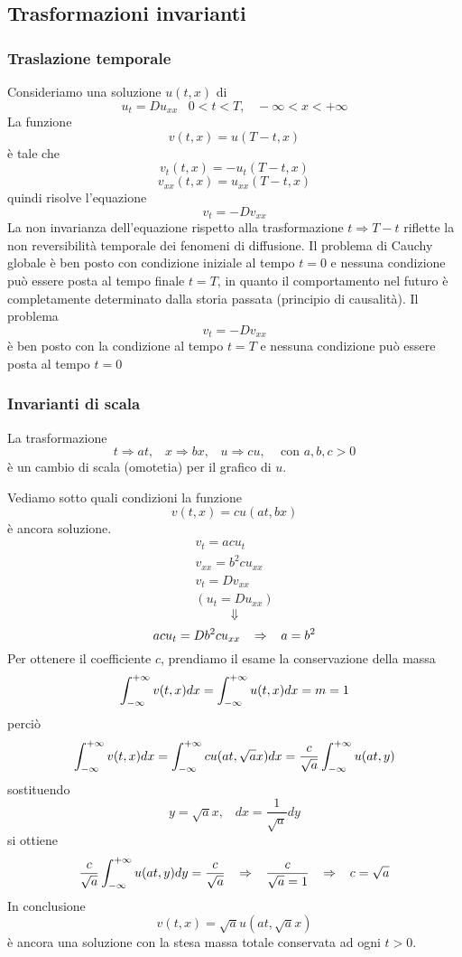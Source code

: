 \subsection{Trasformazioni invarianti}
\subsubsection{Traslazione temporale}
Consideriamo una soluzione $u(t,x)$ di
\[
	u_t= Du_{xx} \;\;\; 0< t< T, \;\;\; - \infty <x < +\infty
\]
La funzione
\[
	v(t,x)= u(T-t,x)
\]
\`e tale che
\[
	v_t(t,x)= -u_t(T-t, x)
\]
\[
	v_{xx}(t, x)= u_{xx}(T-t,x)
\]
quindi risolve l'equazione
\[
	v_t= -Dv_{xx}
\]
La non invarianza dell'equazione rispetto alla trasformazione $t \Rightarrow
T-t$
riflette la non reversibilit\`a temporale dei fenomeni di diffusione.
Il problema di Cauchy globale \`e ben posto con condizione iniziale al tempo
$t=0$ e nessuna condizione pu\`o essere posta al tempo finale $t=T$, in quanto
il comportamento nel futuro \`e completamente determinato dalla storia passata
(principio di causalit\`a).
Il problema
\[
	v_t= -Dv_{xx}
\]
\`e ben posto con la condizione al tempo $t=T$ e nessuna condizione pu\`o essere
posta al tempo $t=0$
\subsubsection{Invarianti di scala}
La trasformazione
\[
	t\Rightarrow at, \;\;\; x \Rightarrow bx, \;\;\; u\Rightarrow cu,
	\;\;\;
	\text{ con }
	a,b,c>0
\]
\`e un cambio di scala (omotetia) per il grafico di $u$.

Vediamo sotto quali condizioni la funzione
\[
	v(t,x)= cu(at, bx)
\]
\`e ancora soluzione.
\[
	\begin{array}{l}
		v_t= acu_t \\
		v_{xx}= b^2 c u_{xx}  \\
		v_t= Dv_{xx} \\
		\left( u_t= Du_{xx} \right)
	\end{array}
\]
\[
	\Downarrow
\]
\[
	acu_t= Db^2 c u_{xx} \;\;\; \Rightarrow \;\;\; a=b^2
\]
Per ottenere il coefficiente $c$, prendiamo il esame la conservazione della
massa
\[
	\int_{- \infty}^{+ \infty} v(t,x) dx = \int_{- \infty}^{+ \infty} u(t,x) dx = m= 1
\]
perci\`o
\[
	\int_{- \infty}^{+ \infty} v(t,x) dx=
	\int_{- \infty}^{+ \infty} cu(at, \sqrt{a}x) dx= \frac{c}{\sqrt{a}}
	\int_{- \infty}^{+ \infty} u(at,y)
\]
sostituendo
\[
	y=\sqrt{a}x, \;\;\; dx= \frac{1}{\sqrt{a}}dy
\]
si ottiene
\[
	\frac{c}{\sqrt{a}}
	\int_{- \infty}^{+ \infty} u(at,y)dy= \frac{c}{\sqrt{a}}
	\;\;\; \Rightarrow \;\;\;
	\frac{c}{\sqrt{a}=1}
	\;\;\; \Rightarrow \;\;\;
	c=\sqrt{a}
\]
In conclusione
\[
	v(t,x)= \sqrt{a}u(at, \sqrt{a}x)
\]
\`e ancora una soluzione con la stesa massa totale conservata ad ogni $t>0$.

